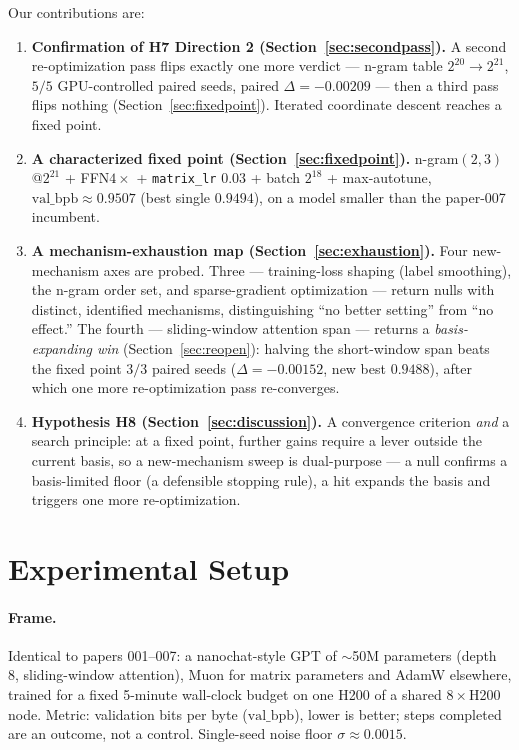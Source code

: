 \documentclass{article}
\newcommand{\valbpb}{\mathrm{val\_bpb}}
\begin{document}
Our contributions are:
\begin{enumerate}
    \item \textbf{Confirmation of H7 Direction 2 (Section~\ref{sec:secondpass}).} A second re-optimization pass flips exactly one more verdict --- n-gram table $2^{20} \rightarrow 2^{21}$, $5/5$ GPU-controlled paired seeds, paired $\Delta = -0.00209$ --- then a third pass flips nothing (Section~\ref{sec:fixedpoint}). Iterated coordinate descent reaches a fixed point.
    \item \textbf{A characterized fixed point (Section~\ref{sec:fixedpoint}).} n-gram$(2,3)$@$2^{21}$ + FFN$4\times$ + \texttt{matrix\_lr} $0.03$ + batch $2^{18}$ + max-autotune, $\valbpb \approx 0.9507$ (best single $0.9494$), on a model smaller than the paper-007 incumbent.
    \item \textbf{A mechanism-exhaustion map (Section~\ref{sec:exhaustion}).} Four new-mechanism axes are probed. Three --- training-loss shaping (label smoothing), the n-gram order set, and sparse-gradient optimization --- return nulls with distinct, identified mechanisms, distinguishing ``no better setting'' from ``no effect.'' The fourth --- sliding-window attention span --- returns a \emph{basis-expanding win} (Section~\ref{sec:reopen}): halving the short-window span beats the fixed point $3/3$ paired seeds ($\Delta = -0.00152$, new best $0.9488$), after which one more re-optimization pass re-converges.
    \item \textbf{Hypothesis H8 (Section~\ref{sec:discussion}).} A convergence criterion \emph{and} a search principle: at a fixed point, further gains require a lever outside the current basis, so a new-mechanism sweep is dual-purpose --- a null confirms a basis-limited floor (a defensible stopping rule), a hit expands the basis and triggers one more re-optimization.
\end{enumerate}

\section{Experimental Setup}
\label{sec:setup}

\paragraph{Frame.} Identical to papers 001--007: a nanochat-style GPT \cite{karpathy2025nanochat} of $\sim$50M parameters (depth 8, sliding-window attention), Muon \cite{jordan2024muon} for matrix parameters and AdamW elsewhere, trained for a fixed 5-minute wall-clock budget on one H200 of a shared $8\times$H200 node. Metric: validation bits per byte ($\valbpb$), lower is better; steps completed are an outcome, not a control. Single-seed noise floor $\sigma \approx 0.0015$.
\end{document}
